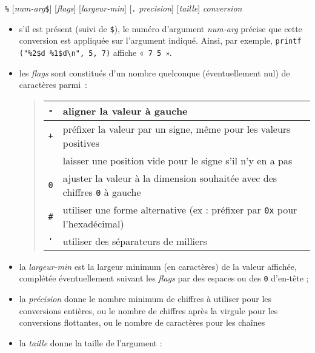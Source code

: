 \documentclass [twoside] {report}
\begin{document}
\texttt {\%} [\textit {num-arg}\verb|$|] [\textit {flags}] [\textit {largeur-min}] [\verb|.| \textit {precision}] [\textit {taille}] \textit {conversion}

\begin {itemize}
    \item s'il est présent (suivi de \verb|$|), le numéro d'argument
	\textit {num-arg} précise que cette conversion est appliquée
	sur l'argument indiqué. Ainsi, par exemple,
	\verb|printf ("%2$d %1$d\n", 5, 7)| affiche «~\verb|7 5|~».

    \item les \textit {flags} sont constitués d'un nombre quelconque
	(éventuellement nul) de caractères parmi~:

	\begin {quote}
	\begin {tabular} {|c|l|} \hline
	    \verb|-| & aligner la valeur à gauche
		\\ \hline
	    \verb|+| & préfixer la valeur par un signe, même pour
		les valeurs positives
		\\ \hline
	    \verb*| |& laisser une position vide pour le signe s'il n'y en
		a pas
		\\ \hline
	    \verb*|0|& ajuster la valeur à la dimension souhaitée avec
		des chiffres \verb|0| à gauche
		\\ \hline
	    \verb*|#|& utiliser une forme alternative (ex : préfixer par
		\verb|0x| pour l'hexadécimal)
		\\ \hline
	    \verb|'| & utiliser des séparateurs de milliers
		\\ \hline
	\end {tabular} 
	\end {quote}

    \item la \textit {largeur-min} est la largeur minimum (en caractères)
	de la valeur affichée, complétée éventuellement suivant les
	\textit {flags} par des espaces ou des \verb|0| d'en-tête ;

    \item la \textit {précision} donne le nombre minimum de chiffres
	à utiliser pour les conversions entières, ou le nombre de
	chiffres après la virgule pour les conversions flottantes,
	ou le nombre de caractères pour les chaînes

    \item la \textit {taille} donne la taille de l'argument :


\end{itemize}
\end{document}
